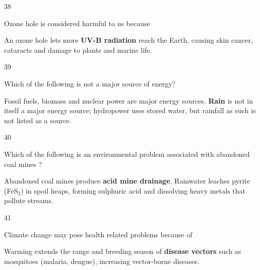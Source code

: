 \begin{question}{38}
{Ozone hole is considered harmful to us because\par}
\begin{explain}
An ozone hole lets more \textbf{UV-B radiation} reach the Earth, causing skin cancer, cataracts and damage to plants and marine life.
\end{explain}
\end{question}

\begin{question}{39}
{Which of the following is not a major source of energy?\par}
\begin{explain}
Fossil fuels, biomass and nuclear power are major energy sources. \textbf{Rain} is not in itself a major energy source; hydropower uses stored water, but rainfall as such is not listed as a source.
\end{explain}
\end{question}

\begin{question}{40}
{Which of the following is an environmental problem associated with abandoned coal mines ?\par}
\begin{explain}
Abandoned coal mines produce \textbf{acid mine drainage}. Rainwater leaches pyrite (FeS$_2$) in spoil heaps, forming sulphuric acid and dissolving heavy metals that pollute streams.
\end{explain}
\end{question}

\begin{question}{41}
{Climate change may pose health related problems because of\par}
\begin{explain}
Warming extends the range and breeding season of \textbf{disease vectors} such as mosquitoes (malaria, dengue), increasing vector-borne diseases.
\end{explain}
\end{question}

